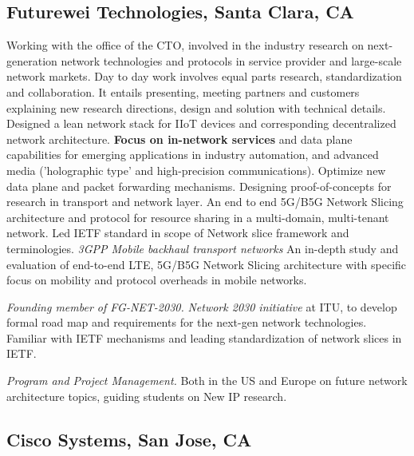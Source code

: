 \documentclass[11pt,a4paper,sans]{moderncv} %
\begin{document}
\subsection{Futurewei Technologies, Santa Clara, CA}
{Working with the office of the CTO, involved in the industry research on next-generation network technologies and protocols in service provider and large-scale network markets. Day to day work involves equal parts research, standardization and collaboration. It entails presenting, meeting partners and customers explaining new research directions, design and solution with technical details.\\
}
{Designed a lean network stack for IIoT devices and corresponding decentralized network architecture. 
}
{\textbf{Focus on in-network services} and data plane capabilities for emerging applications in industry automation, and advanced media ('holographic type' and high-precision communications).  Optimize new data plane and packet forwarding mechanisms. Designing proof-of-concepts for research in transport and network layer. 
}
{An end to end 5G/B5G Network Slicing architecture and  protocol for resource sharing in a multi-domain, multi-tenant network. Led IETF standard in scope of Network slice framework and terminologies.
\textit{3GPP Mobile backhaul transport networks} An in-depth study and evaluation of end-to-end LTE, 5G/B5G Network Slicing architecture with specific focus on mobility and protocol overheads in mobile networks.
} 

 {\textit{Founding member of FG-NET-2030.}}{}{}{}
 {\emph{Network 2030 initiative} at ITU, to develop formal road map and requirements for the next-gen network technologies. Familiar with IETF mechanisms and leading standardization of network slices in IETF.
 }

 {\textit{Program and Project Management.}}{}{}{}
{Both in the US and Europe on future network architecture topics, guiding students on New IP research.
}

\subsection{Cisco Systems, San Jose, CA}
\end{document}
